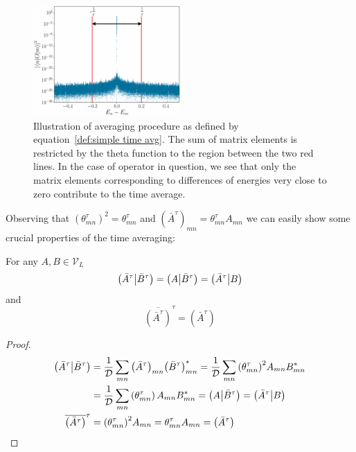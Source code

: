 \begin{figure}[htbp]
  \centering
  \includegraphics[width=0.5\textwidth]{Figures/cutoff_flat.pdf}
  \caption{Illustration of averaging procedure as defined by equation~\eqref{def:simple time avg}. The sum
  of matrix elements is restricted by the theta function to the region between the two red lines. In the case
  of operator in question, we see that only the matrix elements corresponding to differences of energies
  very close to zero contribute to the time average. }
  \label{fig:cutoff}
\end{figure}


Observing that \({\left(\theta_{mn}^{\tau}\right)}^2 = \theta_{mn}^{\tau}\) and \({\left(\bar{A}^{\tau}\right)}_{mn} =
\theta_{mn}^{\tau} A_{mn}\) we can easily show some crucial properties of the time averaging:
\begin{proposition}
  For any \(A,B \in \mathcal{V}_L\)
  \begin{equation*}
    \left(\bar{A}^{\tau} \middle| \bar{B}^{\tau}\right) = \left(A \middle| \bar{B}^{\tau}\right) = \left(\bar{A}^{\tau} \middle| B\right)
  \end{equation*}
  and
  \begin{equation*}
    \overline{\left(\bar{A}^{\tau}\right)}^{\tau} = \left(\bar{A}^{\tau}\right)
  \end{equation*}
  \label{prop:projection}
\end{proposition}

\begin{proof}
  \begin{align*}
    \left(\bar{A}^{\tau} \middle| \bar{B}^{\tau}\right)  & = \frac{1}{\mathcal{D}} \sum_{mn} {\left(\bar{A}^{\tau}\right)}_{mn}
    {\left(\bar{B}^{\tau}\right)}_{mn}^{\ast} = \frac{1}{\mathcal{D}} \sum_{mn} {\left(\theta_{mn}^{\tau}\right)}^2 A_{mn} B_{mn}^{\ast} \nonumber{}               \\
    & = \frac{1}{\mathcal{D}} \sum_{mn} \left(\theta_{mn}^{\tau}\right) A_{mn} B_{mn}^{\ast} =
    \left(A \middle| \bar{B}^{\tau}\right) = \left(\bar{A}^{\tau} \middle| B\right)                                                                                                        \\
    \overline{\left(\bar{A}^{\tau}\right)}^{\tau} & = {\left(\theta_{mn}^{\tau}\right)}^2 A_{mn} = \theta_{mn}^{\tau} A_{mn} = \left(\bar{A}^{\tau}\right)
  \end{align*}
  
\end{proof}

